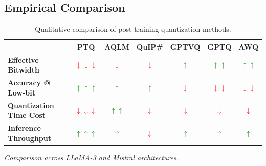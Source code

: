 \subsection{Empirical Comparison}


\begin{table}[htbp]
\centering
\begin{tabular}{lcccccc}
  \hline
  & \textbf{PTQ} & \textbf{AQLM} & \textbf{QuIP\#} & \textbf{GPTVQ} & \textbf{GPTQ} & \textbf{AWQ} \\
  \hline
  \textbf{Effective Bitwidth}
  & \textcolor{red}{\(\downarrow\downarrow\downarrow\)}
  & \textcolor{red}{\(\downarrow\)}
  & \textcolor{red}{\(\downarrow\)}
  & \textcolor{green}{\(\uparrow\)}
  & \textcolor{green}{\(\uparrow\uparrow\)}
  & \textcolor{green}{\(\uparrow\uparrow\)} \\

  \textbf{Accuracy @ Low-bit}
  & \textcolor{green}{\(\uparrow\uparrow\uparrow\)}
  & \textcolor{green}{\(\uparrow\)}
  & \textcolor{green}{\(\uparrow\)}
  & \textcolor{red}{\(\downarrow\)}
  & \textcolor{red}{\(\downarrow\downarrow\)}
  & \textcolor{red}{\(\downarrow\downarrow\)} \\

  \textbf{Quantization Time Cost}
  & \textcolor{red}{\(\downarrow\downarrow\downarrow\)}
  & \textcolor{green}{\(\uparrow\uparrow\)}
  & \textcolor{red}{\(\downarrow\)}
  & \textcolor{red}{\(\downarrow\)}
  & \textcolor{red}{\(\downarrow\)}
  & \textcolor{red}{\(\downarrow\)} \\

  \textbf{Inference Throughput}
  & \textcolor{green}{\(\uparrow\uparrow\uparrow\)}
  & \textcolor{green}{\(\uparrow\)}
  & \textcolor{red}{\(\downarrow\)}
  & \textcolor{green}{\(\uparrow\)}
  & \textcolor{green}{\(\uparrow\)}
  & \textcolor{green}{\(\uparrow\)} \\
  \hline
\end{tabular}
\caption{Qualitative comparison of post-training quantization methods.}
\end{table}




\textit{Comparison across LLaMA-3 and Mistral architectures.}

